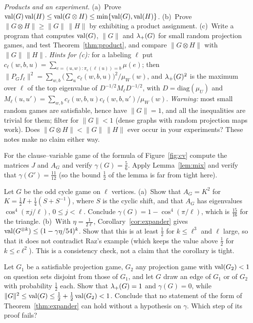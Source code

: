 \begin{exercise}[\stars{$\star\star$}]\label{ex:rep-prod}
\emph{Products and an experiment.}  (a)~Prove $\operatorname{val}(G)\operatorname{val}(H)\le\operatorname{val}(G\otimes H)\le\min\{\operatorname{val}(G),\operatorname{val}(H)\}$.  (b)~Prove $\|G\otimes H\|\ge\|G\|\,\|H\|$ by exhibiting a product assignment.
(c)~Write a program that computes $\operatorname{val}(G)$, $\|G\|$ and $\lambda_{+}(G)$ for small random projection games, and test Theorem~\ref{thm:product}, and compare $\|G\otimes H\|$ with $\|G\|\,\|H\|$.
\emph{Hints for (c):} for a labeling $\ell$ put $c_\ell(w,b,u)=\sum_{e=(u,w)\colon\pi_e(\ell(u))=b}\mu(e)$; then $\|P_Gf_\ell\|^2=\sum_{w,b}\big(\sum_uc_\ell(w,b,u)\big)^2/\mu_W(w)$, and $\lambda_{+}(G)^2$ is the maximum over $\ell$ of the top eigenvalue of $D^{-1/2}M_\ell D^{-1/2}$, with $D=\mathrm{diag}(\mu_U)$ and $M_\ell(u,u')=\sum_{w,b}c_\ell(w,b,u)c_\ell(w,b,u')/\mu_W(w)$.
\emph{Warning:} most small random games are satisfiable, hence have $\|G\|=1$, and all the inequalities are trivial for them; filter for $\|G\|<1$ (dense graphs with random projection maps work).  Does $\|G\otimes H\|<\|G\|\,\|H\|$ ever occur in your experiments?  These notes make no claim either way.
\end{exercise}

\begin{exercise}[\stars{$\star$}]\label{ex:fig-gap}
For the clause--variable game of the formula of Figure~\ref{fig:cv} compute the matrices $J$ and $A_G$ and verify $\gamma(G)=\frac56$.  Apply Lemma~\ref{lem:mix} and verify that $\gamma(G')=\frac{11}{12}$ (so the bound $\frac12$ of the lemma is far from tight here).
\end{exercise}

\begin{exercise}[\stars{$\star\star$}]\label{ex:cycle-gap}
Let $G$ be the odd cycle game on $\ell$ vertices.  (a)~Show that $A_G=K^2$ for $K=\frac12I+\frac14(S+S^{-1})$, where $S$ is the cyclic shift, and that $A_G$ has eigenvalues $\cos^4(\pi j/\ell)$, $0\le j<\ell$.  Conclude $\gamma(G)=1-\cos^4(\pi/\ell)$, which is $\frac{15}{16}$ for the triangle.
(b)~With $\eta=\frac1{2\ell}$, Corollary~\ref{cor:expander} gives $\operatorname{val}(G^{\otimes k})\le(1-\gamma\eta/54)^k$.  Show that this is at least $\frac12$ for $k\le\ell^3$ and $\ell$ large, so that it does not contradict Raz's example (which keeps the value above $\frac12$ for $k\le c\ell^2$).  This is a consistency check, not a claim that the corollary is tight.
\end{exercise}

\begin{exercise}[\stars{$\star\star$}]\label{ex:disjoint}
Let $G_1$ be a satisfiable projection game, $G_2$ any projection game with $\operatorname{val}(G_2)<1$ on question sets disjoint from those of $G_1$, and let $G$ draw an edge of $G_1$ or of $G_2$ with probability $\frac12$ each.  Show that $\lambda_{+}(G)=1$ and $\gamma(G)=0$, while $\|G\|^2\le\operatorname{val}(G)\le\frac12+\frac12\operatorname{val}(G_2)<1$.
Conclude that no statement of the form of Theorem~\ref{thm:expander} can hold without a hypothesis on $\gamma$.  Which step of its proof fails?
\end{exercise}

